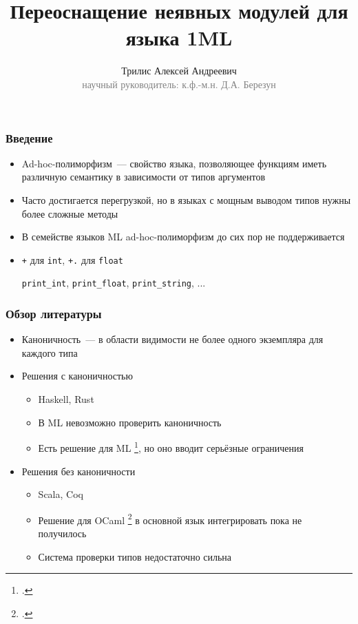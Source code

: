 \documentclass{beamer}
\begin{document}
\title[Неявные модули в 1ML]{Переоснащение неявных модулей для языка 1ML }
\author[Трилис А.А.]{Трилис Алексей Андреевич\\{\footnotesize\textcolor{gray}{научный руководитель: к.ф.-м.н. Д.А. Березун}}}
\frame{\titlepage}

\begin{frame}\frametitle{Введение}
\begin{itemize}
  \item Ad-hoc-полиморфизм~--- свойство языка, позволяющее функциям иметь различную семантику в зависимости от типов аргументов
  \item Часто достигается перегрузкой, но в языках с мощным выводом типов нужны более сложные методы
  \item В семействе языков ML ad-hoc-полиморфизм до сих пор не поддерживается
  \item \texttt{+} для \texttt{int}, \texttt{+.} для \texttt{float}

  \texttt{print\_int}, \texttt{print\_float}, \texttt{print\_string}, ...
\end{itemize}
\end{frame}

\lstset{language=haskell}
\begin{frame}[fragile]\frametitle{Обзор литературы}
\begin{itemize}
  \item Каноничность~--- в области видимости не более одного экземпляра для каждого типа 
  \item Решения с каноничностью
  \begin{itemize}
    \item Haskell, Rust
    \item В ML невозможно проверить каноничность
    \item Есть решение для ML \footcite{ml_typeclasses}, но оно вводит серьёзные ограничения
  \end{itemize}
  \item Решения без каноничности
  \begin{itemize}
    \item Scala, Coq
    \item Решение для OCaml \footcite{white} в основной язык интегрировать пока не получилось
    \item Система проверки типов недостаточно сильна
  \end{itemize}
\end{itemize}
\end{frame}
\end{document}

